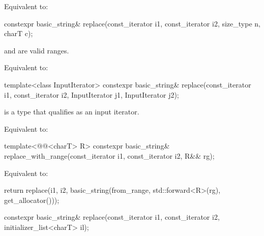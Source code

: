 \begin{itemdescr}
\pnum
\effects
Equivalent to: 
\end{itemdescr}

%
\begin{itemdecl}
constexpr basic_string& replace(const_iterator i1, const_iterator i2, size_type n, charT c);
\end{itemdecl}

\begin{itemdescr}
\pnum
\expects
{} and  are valid ranges.

\pnum
\effects
Equivalent to: 
\end{itemdescr}

%
\begin{itemdecl}
template<class InputIterator>
  constexpr basic_string& replace(const_iterator i1, const_iterator i2,
                                  InputIterator j1, InputIterator j2);
\end{itemdecl}

\begin{itemdescr}
\pnum
\constraints
{} is a type that qualifies as an input
iterator.

\pnum
\effects
Equivalent to: 
\end{itemdescr}

%
\begin{itemdecl}
template<@@<charT> R>
  constexpr basic_string& replace_with_range(const_iterator i1, const_iterator i2, R&& rg);
\end{itemdecl}

\begin{itemdescr}
\pnum
\effects
Equivalent to:
\begin{codeblock}
return replace(i1, i2, basic_string(from_range, std::forward<R>(rg), get_allocator()));
\end{codeblock}
\end{itemdescr}

%
\begin{itemdecl}
constexpr basic_string& replace(const_iterator i1, const_iterator i2, initializer_list<charT> il);
\end{itemdecl}


